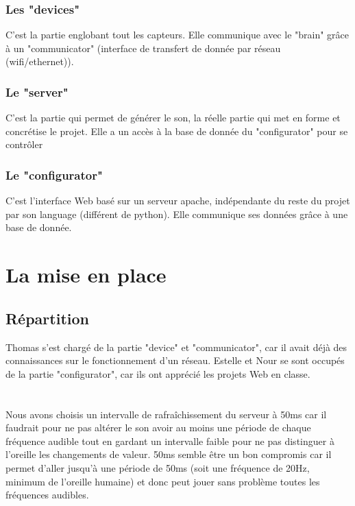 \documentclass[12pt]{article}
\begin{document}
	\subsubsection{Les "devices"}
	C'est la partie englobant tout les capteurs. Elle communique avec le "brain" grâce à un "communicator" (interface de transfert de donnée par réseau (wifi/ethernet)).
	\subsubsection{Le "server"}
	C'est la partie qui permet de générer le son, la réelle partie qui met en forme et concrétise le projet. Elle a un accès à la base de donnée du "configurator" pour se contrôler
	\subsubsection{Le "configurator"}
	C'est l'interface Web basé sur un serveur apache, indépendante du reste du projet par son language (différent de python). Elle communique ses données grâce à une base de donnée. 
	\section{La mise en place}
	\subsection{Répartition}
	Thomas s'est chargé de la partie "device" et "communicator", car il avait déjà des connaissances sur le fonctionnement d'un réseau. Estelle et Nour se sont occupés de la partie "configurator", car ils ont apprécié les projets Web en classe.
	\section{}
	Nous avons choisis un intervalle de rafraîchissement du serveur à 50ms car il faudrait pour ne pas altérer le son avoir au moins une période de chaque fréquence audible tout en gardant un intervalle faible pour ne pas distinguer à l'oreille les changements de valeur. 50ms semble être un bon compromis car il permet d'aller jusqu'à une période de 50ms (soit une fréquence de 20Hz, minimum de l'oreille humaine) et donc peut jouer sans problème toutes les fréquences audibles.
\end{document}
